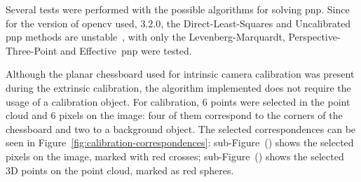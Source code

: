 Several tests were performed with the possible algorithms for solving \ac{pnp}. Since for the version of \ac{opencv} used, $3.2.0$, the Direct-Least-Squares and Uncalibrated \ac{pnp} methods are unstable~\cite{opencv_doc}, with only the Levenberg-Marquardt, Perspective-Three-Point and Effective~\ac{pnp} were tested. 

Although the planar chessboard used for intrinsic camera calibration was present during the extrinsic calibration, the algorithm implemented does not require the usage of a calibration object. For calibration, 6 points were selected in the point cloud and 6 pixels on the image: four of them correspond to the corners of the chessboard and two to a background object. The selected correspondences can be seen in Figure~\ref{fig:calibration-correspondences}: sub-Figure~() shows the selected pixels on the image, marked with red crosses; sub-Figure~() shows the selected 3D points on the point cloud, marked as red spheres.


